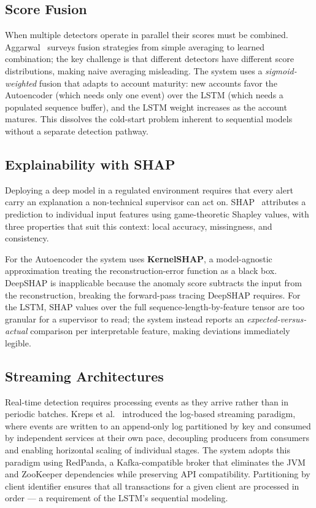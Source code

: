 \subsection{Score Fusion}

When multiple detectors operate in parallel their scores must be combined. Aggarwal~\cite{aggarwal} surveys fusion strategies from simple averaging to learned combination; the key challenge is that different detectors have different score distributions, making naive averaging misleading. The system uses a \emph{sigmoid-weighted} fusion that adapts to account maturity: new accounts favor the Autoencoder (which needs only one event) over the LSTM (which needs a populated sequence buffer), and the LSTM weight increases as the account matures. This dissolves the cold-start problem inherent to sequential models without a separate detection pathway.

\subsection{Explainability with SHAP}

Deploying a deep model in a regulated environment requires that every alert carry an explanation a non-technical supervisor can act on. SHAP~\cite{shap} attributes a prediction to individual input features using game-theoretic Shapley values, with three properties that suit this context: local accuracy, missingness, and consistency.

For the Autoencoder the system uses \textbf{KernelSHAP}, a model-agnostic approximation treating the reconstruction-error function as a black box. DeepSHAP is inapplicable because the anomaly score subtracts the input from the reconstruction, breaking the forward-pass tracing DeepSHAP requires. For the LSTM, SHAP values over the full sequence-length-by-feature tensor are too granular for a supervisor to read; the system instead reports an \emph{expected-versus-actual} comparison per interpretable feature, making deviations immediately legible.

\subsection{Streaming Architectures}

Real-time detection requires processing events as they arrive rather than in periodic batches. Kreps et al.~\cite{kafka} introduced the log-based streaming paradigm, where events are written to an append-only log partitioned by key and consumed by independent services at their own pace, decoupling producers from consumers and enabling horizontal scaling of individual stages. The system adopts this paradigm using RedPanda, a Kafka-compatible broker that eliminates the JVM and ZooKeeper dependencies while preserving API compatibility. Partitioning by client identifier ensures that all transactions for a given client are processed in order --- a requirement of the LSTM's sequential modeling.

